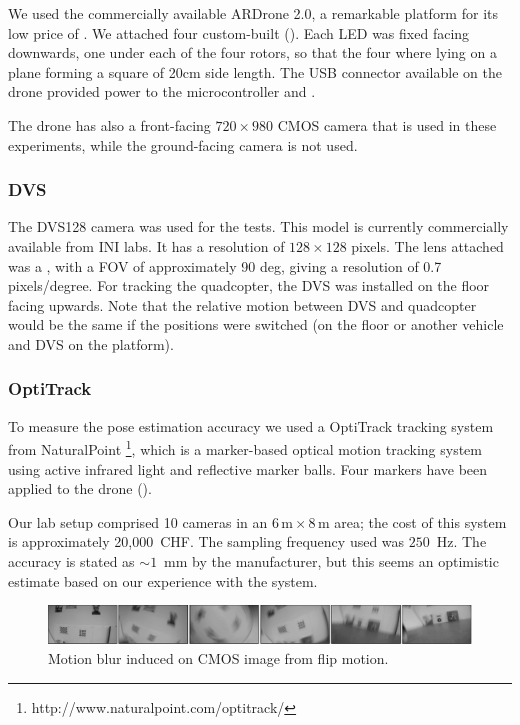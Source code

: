 We used the commercially available ARDrone 2.0, a remarkable platform
for its low price of \xxx. We attached four custom-built \ALMs ().
Each LED was fixed facing downwards, one under each of the four rotors,
so that the four where lying on a plane forming a square of 20cm side
length. The USB connector available on the drone provided power to
the microcontroller and \ALMs.

The drone has also a front-facing $720\times980$ CMOS camera that
is used in these experiments, while the ground-facing camera is not
used.


\subsubsection{DVS }

The DVS128 camera was used for the tests. This model is currently
commercially available from INI labs. It has a resolution of $128\times128$
pixels. The lens attached was a \xxx, with a FOV of approximately
90 deg, giving a resolution of 0.7 pixels/degree. For tracking the
quadcopter, the DVS was installed on the floor facing upwards. Note
that the relative motion between DVS and quadcopter would be the same
if the positions were switched (\ALMs on the floor or another vehicle
and DVS on the platform).


\subsubsection{OptiTrack}

To measure the pose estimation accuracy we used a OptiTrack tracking
system from NaturalPoint%
\footnote{http://www.naturalpoint.com/optitrack/%
}, which is a marker-based optical motion tracking system using active
infrared light and reflective marker balls. Four markers have been
applied to the drone (). 

Our lab setup comprised 10 cameras in an $6\,\mbox{m}\times8\,\mbox{m}$
area; the cost of this system is approximately 20,000~CHF. The sampling
frequency used was $250$~Hz. The accuracy is stated as $\sim1$~mm
by the manufacturer, but this seems an optimistic estimate based on
our experience with the system.



\begin{figure}
\begin{centering}

\par\end{centering}

\includegraphics[width=16cm]{figures/slides/flip_sequence}

\caption{Motion blur induced on CMOS image from flip motion.}
\end{figure}



